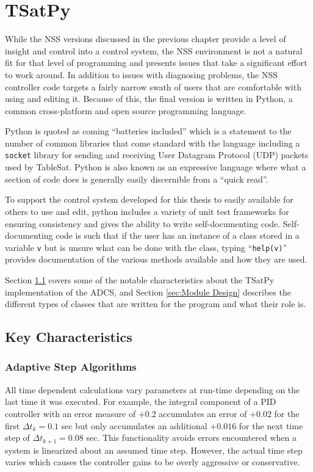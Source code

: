 
\chapter{TSatPy}
\label{chap:TSatPy}

While the NSS versions discussed in the previous chapter provide a level of insight and control into a control system, the NSS environment is not a natural fit for that level of programming and presents issues that take a significant effort to work around.  In addition to issues with diagnosing problems, the NSS controller code targets a fairly narrow swath of users that are comfortable with using and editing it.  Because of this, the final version is written in Python, a common cross-platform and open source programming language.

Python is quoted as coming ``batteries included'' which is a statement to the number of common libraries that come standard with the language including a \verb|socket| library for sending and receiving User Datagram Protocol (UDP) packets used by TableSat.  Python is also known as an expressive language where what a section of code does is generally easily discernible from a ``quick read''.

To support the control system developed for this thesis to easily available for others to use and edit, python includes a variety of unit test frameworks for ensuring consistency and gives the ability to write self-documenting code.  Self-documenting code is such that if the user has an instance of a class stored in a variable \verb|v| but is unsure what can be done with the class, typing ``\verb|help(v)|'' provides documentation of the various methods available and how they are used.

Section \ref{sec:KeyCharacteristics} covers some of the notable characteristics about the TSatPy implementation of the ADCS, and Section \ref{sec:Module Design} describes the different types of classes that are written for the program and what their role is.

\section{Key Characteristics}
\label{sec:KeyCharacteristics}

\subsection{Adaptive Step Algorithms}

All time dependent calculations vary parameters at run-time depending on the last time it was executed. For example, the integral component of a PID controller with an error measure of $+0.2$ accumulates an error of $+0.02$ for the first $\Delta t_k = 0.1$ sec but only accumulates an additional $+0.016$ for the next time step of $\Delta t_{k+1} = 0.08$ sec.  This functionality avoids errors encountered when a system is linearized about an assumed time step.  However, the actual time step varies which causes the controller gains to be overly aggressive or conservative.

